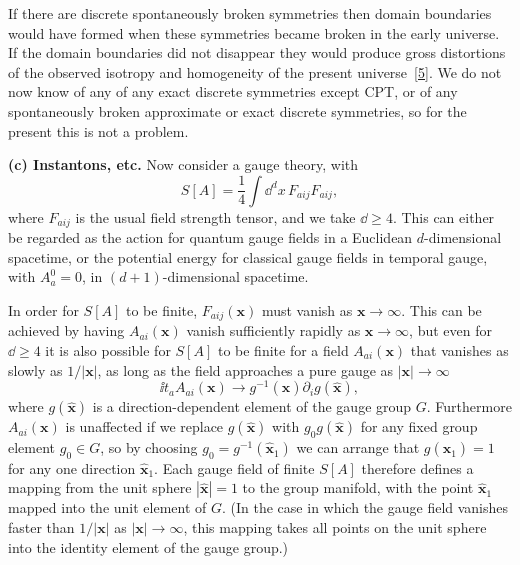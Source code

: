 If there are discrete spontaneously broken symmetries then domain
boundaries would have formed when these symmetries became broken in the
early universe. If the domain boundaries did not disappear they would
produce gross distortions of the observed isotropy and homogeneity of the
present universe~\hyperref[ch23-ref-5]{[5]}. We do not now know of any of
any exact discrete symmetries except CPT, or of any spontaneously broken
approximate or exact discrete symmetries, so for the present this is not a
problem.

\noindent\textbf{(c) Instantons, etc.} Now consider a gauge theory, with
\begin{equation}
 S[A]=\frac{1}{4}\int \dd^d x\,F_{a ij}F_{a ij},
 \tag{23.1.6}\label{eq:23.1.6}
\end{equation}
where $F_{a ij}$ is the usual field strength tensor, and we take
$\dd\geq4$. This can either be regarded as the action for quantum gauge
fields in a Euclidean $d$-dimensional spacetime, or the potential energy for
classical gauge fields in temporal gauge, with $A_a^0=0$, in
$(d+1)$-dimensional spacetime.

In order for $S[A]$ to be finite, $F_{a ij}(\mathbf{x})$ must vanish as
$\mathbf{x}\to\infty$. This can be achieved by having
$A_{a i}(\mathbf{x})$ vanish sufficiently rapidly as
$\mathbf{x}\to\infty$, but even for $\dd\geq4$ it is also possible for $S[A]$
to be finite for a field $A_{a i}(\mathbf{x})$ that vanishes as slowly
as $1/|\mathbf{x}|$, as long as the field approaches a pure gauge as
$|\mathbf{x}|\to\infty$
\begin{equation}
 \ii t_a A_{a i}(\mathbf{x})
 \longrightarrow
 g^{-1}(\hat{\mathbf{x}})\partial_i g(\hat{\mathbf{x}}),
 \tag{23.1.7}\label{eq:23.1.7}
\end{equation}
where $g(\hat{\mathbf{x}})$ is a direction-dependent element of the gauge
group $G$. Furthermore $A_{a i}(\mathbf{x})$ is unaffected if we
replace $g(\hat{\mathbf{x}})$ with $g_0g(\hat{\mathbf{x}})$ for any fixed
group element $g_0\in G$, so by choosing
$g_0=g^{-1}(\hat{\mathbf{x}}_1)$ we can arrange that
$g(\hat{\mathbf{x}}_1)=1$ for any one direction $\hat{\mathbf{x}}_1$. Each
gauge field of finite $S[A]$ therefore defines a mapping from the unit
sphere $|\hat{\mathbf{x}}|=1$ to the group manifold, with the point
$\hat{\mathbf{x}}_1$ mapped into the unit element of $G$. (In the case in
which the gauge field vanishes faster than $1/|\mathbf{x}|$ as
$|\mathbf{x}|\to\infty$, this mapping takes all points on the unit sphere
into the identity element of the gauge group.)

